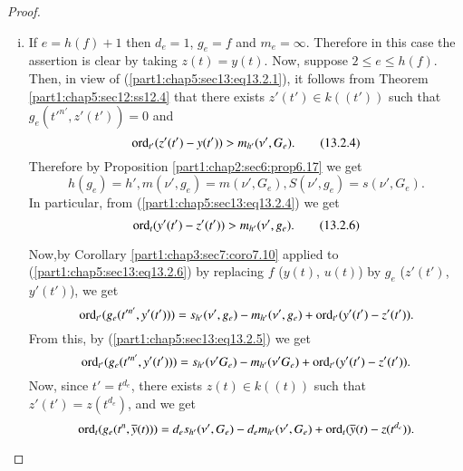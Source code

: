 \begin{proof}
\begin{enumerate}[(i)]
Therefore, in order to prove (\ref{part1:chap5:sec13:eq13.2.2}), it is
enough to prove that
\begin{equation*}
  \ord_t g_e (t^n, \ob{y} (t))> r_e (\nu,
  f).\tag{13.2.3}\label{part1:chap5:sec13:eq13.2.3}  
\end{equation*}
Now, (\ref{part1:chap5:sec13:eq13.2.3}) follows from
Corollary \ref{part1:chap3:sec7:coro7.20}  by taking $a=0$ and
$u=0$. This completes the proof of (i).
\item If $e=h(f)+1$ then $d_e= 1$, $g_e =f$ and
  $m_e=\infty$. Therefore in this case the assertion is clear by
  taking $z(t) = y(t)$. Now, suppose $2 \leq e \leq h(f)$. Then, in
  view of (\ref{part1:chap5:sec13:eq13.2.1}), it follows from Theorem
  \ref{part1:chap5:sec12:ss12.4} that there exists $z' (t') \in k
  ((t'))$ such that $g_e (t'^{n'}, z' (t'))=0$ and 
\begin{equation*}
  \operatorname{ord}_{t'} (z' (t') - y(t')) > m_{h'} (\nu',
  G_e).\tag{13.2.4}\label{part1:chap5:sec13:eq13.2.4} 
\end{equation*}
Therefore by Proposition \ref{part1:chap2:sec6:prop6.17} we get
\begin{equation*}
h(g_e) = h' , m(\nu', g_e) = m(\nu', G_e), S(\nu', g_e) = s(\nu',
G_e).\tag{13.2.5}\label{part1:chap5:sec13:eq13.2.5}  
\end{equation*}
In particular, from (\ref{part1:chap5:sec13:eq13.2.4}) we get
\begin{equation*}
  \operatorname{ord}_t (y' (t') - z' (t'))> m_{h'} (\nu',
  g_e). \tag{13.2.6}\label{part1:chap5:sec13:eq13.2.6}  
\end{equation*}

Now,\pageoriginale by Corollary \ref{part1:chap3:sec7:coro7.10} applied to
(\ref{part1:chap5:sec13:eq13.2.6}) by replacing $f$ (\resp\break  $y(t)$,
\resp $u(t)$) by $g_e$ (\resp $z'(t')$, \resp $y' (t')$), we get
$$
\operatorname{ord}_{t'} (g_e (t'^{n'}, y' (t')))= s_{h'} (\nu', g_e) - m_{h'}(\nu',
g_e) + \operatorname{ord}_{t'} (y' (t') - z' (t')).
$$
From this, by (\ref{part1:chap5:sec13:eq13.2.5}) we get
$$
\operatorname{ord}_{t'} (g_e(t'^{n'}, y' (t')))= s_{h'}(\nu' G_e) - m_{h'} (\nu'
G_e) + \operatorname{ord}_{t'} (y' (t')- z'(t')).
$$
Now, since $t'= t^{d_e}$, there exists $z(t) \in k((t))$ such that $z'
(t')= z(t^{d_e})$, and we get
$$
\operatorname{ord}_t (g_e(t^n , \overline{y} (t))) = d_e s_{h'} (\nu', G_e) - d_e m_{h'}
(\nu', G_e) + \operatorname{ord}_t (\overline{y} (t) - z(t^{d_e})).
$$


\end{enumerate}
\end{proof}
